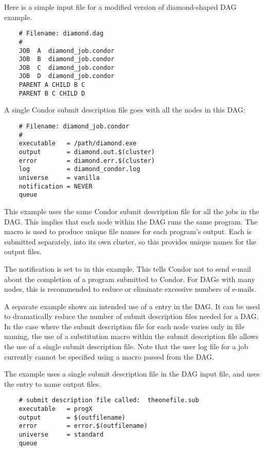 Here is a simple input file for a 
modified version of diamond-shaped DAG example.

\begin{verbatim}
    # Filename: diamond.dag
    #
    JOB  A  diamond_job.condor 
    JOB  B  diamond_job.condor 
    JOB  C  diamond_job.condor	
    JOB  D  diamond_job.condor
    PARENT A CHILD B C
    PARENT B C CHILD D
\end{verbatim}

A single Condor submit description file goes with all the nodes
in this DAG:

\begin{verbatim}
    # Filename: diamond_job.condor
    #
    executable   = /path/diamond.exe
    output       = diamond.out.$(cluster)
    error        = diamond.err.$(cluster)
    log          = diamond_condor.log
    universe     = vanilla
    notification = NEVER
    queue
\end{verbatim}

This example uses the same Condor submit description file
for all the jobs in the DAG.
This implies that each node within the DAG runs the
same program.
The  macro
is used to produce unique file names for each program's output.
Each  is submitted separately, into its own cluster,
so this provides unique names for the output files.

The notification is set to \verb@NEVER@ in this example.
This tells Condor not to send e-mail about the completion of a program
submitted to Condor.
For DAGs with many nodes, this is recommended
to reduce or eliminate excessive numbers of e-mails.

A separate example shows an intended use of a  entry
in the DAG.
It can be used to dramatically reduce the number of submit description
files needed for a DAG.
In the case where the submit description file for each node
varies only in file naming, the use of a substitution macro
within the submit description file allows the use of 
a single submit description file.
Note that the user log file for a job currently cannot be specified
using a macro passed from the DAG.

The example uses a single submit description file in the DAG input
file, and uses the  entry to name output files.

\footnotesize
\begin{verbatim}
    # submit description file called:  theonefile.sub
    executable   = progX
    output       = $(outfilename)
    error        = error.$(outfilename)
    universe     = standard
    queue
\end{verbatim}
\normalsize

